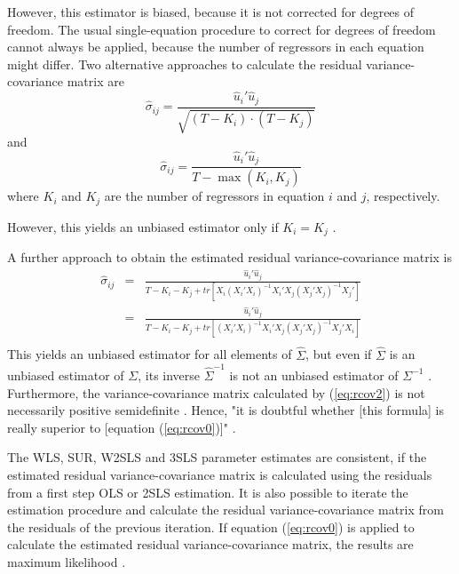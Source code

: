 \documentclass[article]{jss}
\begin{document}
However, this estimator is biased, because it is not corrected for 
degrees of freedom. 
The usual single-equation procedure to correct for degrees of freedom 
cannot always be applied, because the number of regressors in each equation 
might differ.
Two alternative approaches to calculate the residual variance-covariance 
matrix are
\begin{equation}
   \widehat{\sigma}_{ij} = \frac{ \widehat{u}_i' \widehat{u}_j }
   { \sqrt{ \left( T - K_i \right) \cdot \left( T - K_j \right) } }
   \label{eq:rcov1}
\end{equation}
and
\begin{equation}
   \widehat{\sigma}_{ij} = \frac{ \widehat{u}_i' \widehat{u}_j }
   { T - \max \left( K_i , K_j \right) }
\end{equation}
where $K_i$ and $K_j$ are the number of regressors in equation
$i$ and $j$, respectively.

However, this yields an unbiased estimator only if $K_i = K_j$ 
\citep[p. 469]{judge85}. 


A further approach to obtain the estimated residual variance-covariance
matrix is \citep[p. 309]{zellner62c}
\begin{eqnarray}
   \widehat{\sigma}_{ij} & = & 
   \frac{ \widehat{u}_i' \widehat{u}_j } 
   { T - K_i - K_j + tr \left[ X_i \left( X_i' X_i \right)^{-1}
   X_i' X_j \left( X_j' X_j \right)^{-1} X_j' \right] } \\
   & = &
   \frac{ \widehat{u}_i' \widehat{u}_j } 
   { T - K_i - K_j + tr \left[ \left( X_i' X_i \right)^{-1}
   X_i' X_j \left( X_j' X_j \right)^{-1} X_j' X_i \right] } \\
   \label{eq:rcov2}
\end{eqnarray} 
This yields an unbiased estimator for all elements of $\widehat{\Sigma}$,
but even if $\widehat{\Sigma}$ is an unbiased estimator of $\Sigma$, 
its inverse $\widehat{\Sigma}^{-1}$ is not an unbiased estimator 
of $\Sigma^{-1}$ \citep[p.322]{theil71}.
Furthermore, the variance-covariance matrix calculated by (\ref{eq:rcov2})
is not necessarily positive semidefinite \citep[p.322]{theil71}. 
Hence, "it is doubtful whether [this formula] is really superior to 
[equation (\ref{eq:rcov0})]" \citep[p.322]{theil71}.


The WLS, SUR, W2SLS and 3SLS parameter estimates are consistent,
if the estimated residual variance-covariance matrix is calculated
using the residuals from a first step OLS or 2SLS estimation.
It is also possible to iterate the estimation procedure and 
calculate the residual variance-covariance matrix from the
residuals of the previous iteration. 
If equation (\ref{eq:rcov0}) is applied to calculate the estimated
residual variance-covariance matrix, the results are maximum
likelihood \citep[p. 345]{greene02}.
\end{document}
